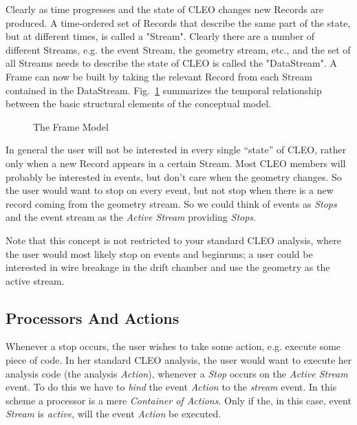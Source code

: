\documentclass[12pt]{article}
\def\displayepsf#1#2#3#4{ %
   \begin{figure}[#1]
   \setlength{\epsfysize}{#3in}
   \centerline{\epsffile{#2}}
   \caption{#4}
   \end{figure}}
\begin{document}
Clearly as time progresses and the state of CLEO changes new Records are
produced. A time-ordered set of Records that describe the same part of
the state, but at different times, is called a
"Stream". Clearly there are a number of different Streams,
e.g. the event Stream, the geometry stream, etc., and the set of all
Streams needs to describe the state of CLEO is called the
"DataStream". A Frame can now be built by taking the relevant Record
from each Stream contained in the DataStream. Fig.~\ref{fig:FrameModel}
summarizes the temporal relationship between the basic structural
elements of the conceptual model.

\displayepsf{ht}{FrameModel.ps}{1.45}{The Frame Model\label{fig:FrameModel}}

In general the user will not be interested in every single ``state'' of
CLEO, rather only when a new Record appears in a certain Stream. Most
CLEO members will probably be interested in events, but don't care when
the geometry changes. So the user would want to stop on every event, but
not stop when there is a new record coming from the geometry stream. So
we could think of events as \emph{Stops} and the event
stream as the \emph{Active Stream} providing
\emph{Stops}.

Note that this concept is not restricted to your standard CLEO analysis,
where the user would most likely stop on events and beginruns; a user
could be interested in wire breakage in the drift chamber and use the
geometry as the active stream.


\subsection{Processors And Actions}

Whenever a stop occurs, the user wishes to take some action,
e.g. execute some piece of code. In her standard CLEO analysis, the user
would want to execute her analysis code (the analysis
\emph{Action}), whenever a \emph{Stop} occurs
on the \emph{Active Stream} event. To do this we
have to \emph{bind} the event \emph{Action} to the
\emph{stream} event. In this scheme a processor is a
mere \emph{Container of Actions}. Only if the, in this case, event
\emph{Stream} is \emph{active}, will the event \emph{Action} be
executed.


\end{document}
